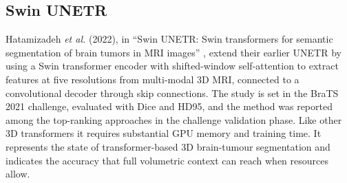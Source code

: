 \subsection{Swin UNETR}
Hatamizadeh \emph{et al.} (2022), in ``Swin UNETR: Swin transformers for semantic segmentation of brain tumors in MRI images'' \cite{hatamizadeh2022swin}, extend their earlier UNETR \cite{hatamizadeh2022unetr} by using a Swin transformer encoder with shifted-window self-attention to extract features at five resolutions from multi-modal 3D MRI, connected to a convolutional decoder through skip connections. The study is set in the BraTS 2021 challenge, evaluated with Dice and HD95, and the method was reported among the top-ranking approaches in the challenge validation phase. Like other 3D transformers it requires substantial GPU memory and training time. It represents the state of transformer-based 3D brain-tumour segmentation and indicates the accuracy that full volumetric context can reach when resources allow.

